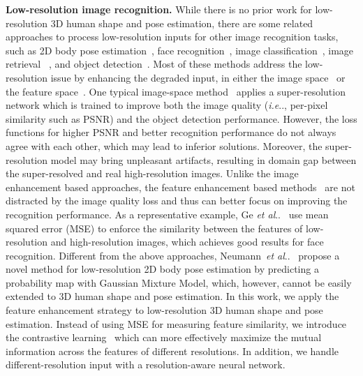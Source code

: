 \documentclass[runningheads]{llncs}
\makeatletter
\DeclareRobustCommand\onedot{\futurelet\@let@token\@onedot}
\def\@onedot{\ifx\@let@token.\else.\null\fi\xspace}
\def\ie{\emph{i.e}\onedot, } \def\Ie{\emph{I.e}\onedot}
\def\etal{\emph{et al}\onedot}
\makeatother
\begin{document}
\noindent \textbf{Low-resolution image recognition.}
While there is no prior work for low-resolution 3D human shape and pose estimation, there are some related approaches to process low-resolution inputs for other image recognition tasks, such as 2D body pose estimation~\cite{neumann2018tiny}, face recognition~\cite{ge2018low,cheng2018low,xxy-iccv17}, image classification~\cite{wang2016studying}, image retrieval ~\cite{tan2018feature,Noh2019better}, and object detection~\cite{haris2018task,li2017perceptualgan}.
Most of these methods address the low-resolution issue by enhancing the degraded input, in either the image space~\cite{haris2018task,cheng2018low,wang2016studying} or the feature space~\cite{ge2018low,tan2018feature,li2017perceptualgan,Noh2019better}.
One typical image-space method~\cite{haris2018task} applies a super-resolution network which is trained to improve both the image quality (\ie per-pixel similarity such as PSNR) and the object detection performance.
However, the loss functions for higher PSNR and better recognition performance do not always agree with each other, which may lead to inferior solutions. Moreover, the super-resolution model may bring unpleasant artifacts, resulting in domain gap between the super-resolved and real high-resolution images.
Unlike the image enhancement based approaches, the feature enhancement based methods~\cite{ge2018low,tan2018feature,li2017perceptualgan,Noh2019better} are not distracted by the image quality loss and thus can better focus on improving the recognition performance.
As a representative example, Ge \etal~\cite{ge2018low} use mean squared error (MSE) to enforce the similarity between the features of low-resolution and high-resolution images, which achieves good results for face recognition.
Different from the above approaches, Neumann~\etal~\cite{neumann2018tiny} propose a novel method for low-resolution 2D body pose estimation by predicting a probability map with Gaussian Mixture Model,
which, however, cannot be easily extended to 3D human shape and pose estimation.
In this work, we apply the feature enhancement strategy to low-resolution 3D human shape and pose estimation. 
Instead of using MSE for measuring feature similarity, we introduce the contrastive learning~\cite{oord2018representation} which can more effectively maximize the mutual information across the features of different resolutions.
In addition, we handle different-resolution input with a resolution-aware neural network.
\end{document}
